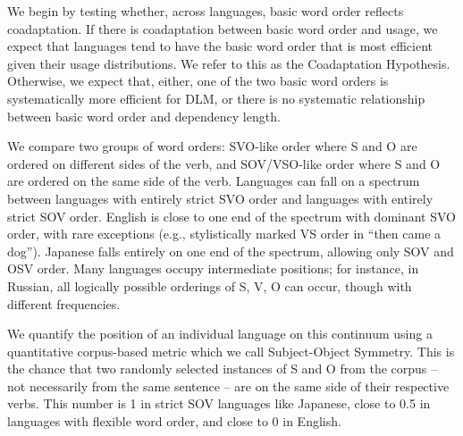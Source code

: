 \documentclass[11pt,a4paper]{article}
\newcommand\mhahn[1]{{\color{red}(#1)}}
\begin{document}
We begin by testing whether, across languages, basic word order reflects coadaptation.
If there is coadaptation between basic word order and usage, we expect that languages tend to have the basic word order that is most efficient given their usage distributions.
We refer to this as the Coadaptation Hypothesis.
Otherwise, we expect that, either, one of the two basic word orders is systematically more efficient for DLM, or there is no systematic relationship between basic word order and dependency length.




We compare two groups of word orders: SVO-like order where S and O are ordered on different sides of the verb, and SOV/VSO-like order where S and O are ordered on the same side of the verb.
Languages can fall on a spectrum between languages with entirely strict SVO order and languages with entirely strict SOV order.
English is close to one end of the spectrum with dominant SVO order, with rare exceptions (e.g., stylistically marked VS order in ``then came a dog'').
Japanese falls entirely on one end of the spectrum, allowing only SOV and OSV order.
Many languages occupy intermediate positions; for instance, in Russian, all logically possible orderings of S, V, O can occur, though with different frequencies.

We quantify the position of an individual language on this continuum using a quantitative corpus-based metric which we call {Subject-Object Symmetry}.
This is the chance that two randomly selected instances of S and O from the corpus -- not necessarily from the same sentence -- are on the same side of their respective verbs. This number is 1 in strict SOV languages like Japanese, close to 0.5 in languages with flexible word order, and close to 0 in English.

\end{document}

